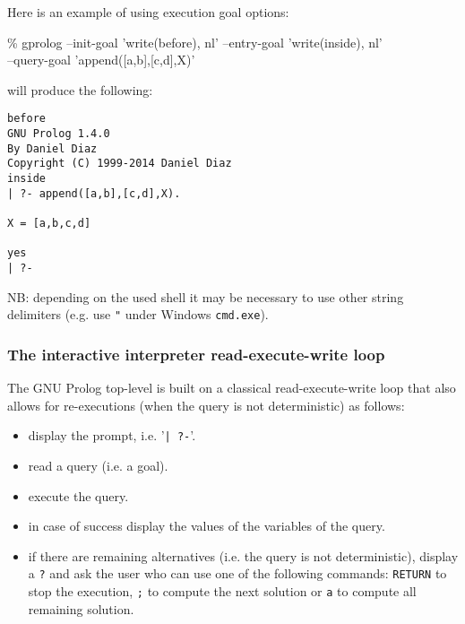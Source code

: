 Here is an example of using execution goal options:

\begin{Code}
\% gprolog --init-goal 'write(before), nl' --entry-goal 'write(inside), nl'\\
--query-goal 'append([a,b],[c,d],X)'
\end{Code}

will produce the following:

\begin{Code}
\begin{verbatim}
before
GNU Prolog 1.4.0
By Daniel Diaz
Copyright (C) 1999-2014 Daniel Diaz
inside
| ?- append([a,b],[c,d],X).

X = [a,b,c,d]

yes
| ?-
\end{verbatim}
\end{Code}

NB: depending on the used shell it may be necessary to use other string
delimiters (e.g. use \texttt{"} under Windows \texttt{cmd.exe}).

\subsubsection{The interactive interpreter read-execute-write loop}
The GNU Prolog top-level is built on a classical read-execute-write loop that
also allows for re-executions (when the query is not deterministic) as
follows:

\begin{itemize}

\item display the prompt, i.e. '\texttt{| ?-}'.

\item read a query (i.e. a goal).

\item execute the query.

\item in case of success display the values of the variables of the query.

\item if there are remaining alternatives (i.e. the query is not
deterministic), display a \texttt{?} and ask the user who can use one of the
following commands: \texttt{RETURN} to stop the execution, \texttt{;} to
compute the next solution or \texttt{a} to compute all remaining solution.

\end{itemize}

